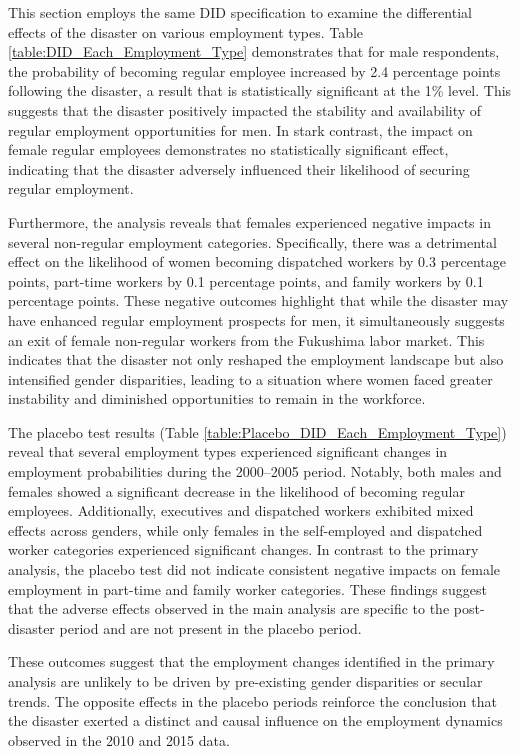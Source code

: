 \documentclass[a4paper,12pt]{article}
\begin{document}
This section employs the same DID specification to examine the differential effects of the disaster on various employment types. Table \ref{table:DID_Each_Employment_Type} demonstrates that for male respondents, the probability of becoming regular employee increased by 2.4 percentage points following the disaster, a result that is statistically significant at the 1\% level. This suggests that the disaster positively impacted the stability and availability of regular employment opportunities for men. In stark contrast, the impact on female regular employees demonstrates no statistically significant effect, indicating that the disaster adversely influenced their likelihood of securing regular employment.

Furthermore, the analysis reveals that females experienced negative impacts in several non-regular employment categories. Specifically, there was a detrimental effect on the likelihood of women becoming dispatched workers by 0.3 percentage points, part-time workers by 0.1 percentage points, and family workers by 0.1 percentage points. These negative outcomes highlight that while the disaster may have enhanced regular employment prospects for men, it simultaneously suggests an exit of female non-regular workers from the Fukushima labor market. This indicates that the disaster not only reshaped the employment landscape but also intensified gender disparities, leading to a situation where women faced greater instability and diminished opportunities to remain in the workforce.

The placebo test results (Table \ref{table:Placebo_DID_Each_Employment_Type}) reveal that several employment types experienced significant changes in employment probabilities during the 2000--2005 period. Notably, both males and females showed a significant decrease in the likelihood of becoming regular employees. Additionally, executives and dispatched workers exhibited mixed effects across genders, while only females in the self-employed and dispatched worker categories experienced significant changes. In contrast to the primary analysis, the placebo test did not indicate consistent negative impacts on female employment in part-time and family worker categories. These findings suggest that the adverse effects observed in the main analysis are specific to the post-disaster period and are not present in the placebo period.

These outcomes suggest that the employment changes identified in the primary analysis are unlikely to be driven by pre-existing gender disparities or secular trends. The opposite effects in the placebo periods reinforce the conclusion that the disaster exerted a distinct and causal influence on the employment dynamics observed in the 2010 and 2015 data.
\end{document}
